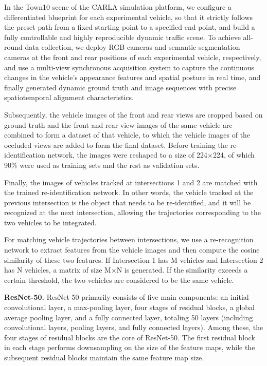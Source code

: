 \documentclass[lettersize,journal]{IEEEtran}
\begin{document}
In the Town10 scene of the CARLA simulation platform, we configure a differentiated blueprint for each experimental vehicle, so that it strictly follows the preset path from a fixed starting point to a specified end point, and build a fully controllable and highly reproducible dynamic traffic scene.
To achieve all-round data collection, we deploy RGB cameras and semantic segmentation cameras at the front and rear positions of each experimental vehicle, respectively, and use a multi-view synchronous acquisition system to capture the continuous changes in the vehicle's appearance features and spatial posture in real time, and finally generated dynamic ground truth and image sequences with precise spatiotemporal alignment characteristics.

Subsequently, the vehicle images of the front and rear views are cropped based on ground truth and the front and rear view images of the same vehicle are combined to form a dataset of that vehicle, to which the vehicle images of the occluded views are added to form the final dataset.
Before training the re-identification network, the images were reshaped to a size of 224\(\times\)224, of which 90\% were used as training sets and the rest as validation sets.

Finally, the images of vehicles tracked at intersections 1 and 2 are matched with the trained re-identification network.
In other words, the vehicle tracked at the previous intersection is the object that needs to be re-identified, and it will be recognized at the next intersection, allowing the trajectories corresponding to the two vehicles to be integrated.

For matching vehicle trajectories between intersections, we use a re-recognition network to extract features from the vehicle images and then compute the cosine similarity of these two features.
If Intersection 1 has M vehicles and Intersection 2 has N vehicles, a matrix of size M×N is generated. 
If the similarity exceeds a certain threshold, the two vehicles are considered to be the same vehicle.

\textbf{ResNet-50.}
ResNet-50 primarily consists of five main components: an initial convolutional layer, a max-pooling layer, four stages of residual blocks, a global average pooling layer, and a fully connected layer, totaling 50 layers (including convolutional layers, pooling layers, and fully connected layers). 
Among these, the four stages of residual blocks are the core of ResNet-50. 
The first residual block in each stage performs downsampling on the size of the feature maps, while the subsequent residual blocks maintain the same feature map size.
\end{document}
